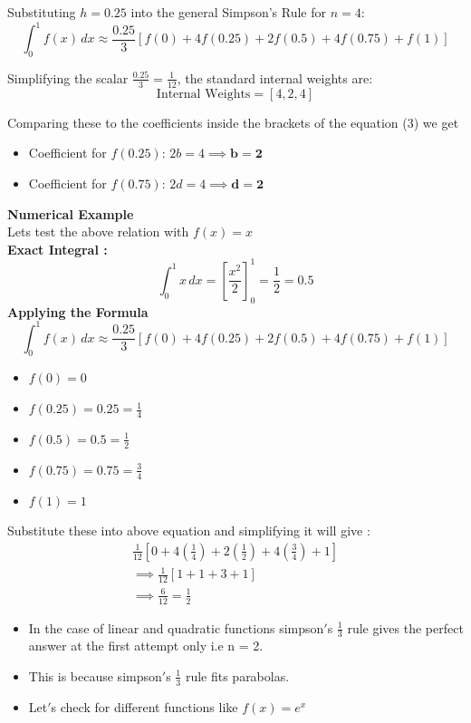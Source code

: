 \documentclass[a4paper,12pt]{article}
\theoremstyle{remark}
\begin{document}
Substituting $h = 0.25$ into the general Simpson's Rule for $n=4$:
\begin{equation}
\int_{0}^{1} f(x) \, dx \approx \frac{0.25}{3} \left[ f(0) + 4f(0.25) + 2f(0.5) + 4f(0.75) + f(1) \right]
\end{equation}

Simplifying the scalar $\frac{0.25}{3} = \frac{1}{12}$, the standard internal weights are:
\begin{equation}
\text{Internal Weights} = [4, 2, 4]
\end{equation}

Comparing these to the coefficients inside the brackets of the equation (3) we get
\begin{itemize}
    \item Coefficient for $f(0.25)$: $2b = 4 \implies \mathbf{b = 2}$
    \item Coefficient for $f(0.75)$: $2d = 4 \implies \mathbf{d = 2}$
\end{itemize}
\textbf{Numerical Example}\\
Lets test the above relation with $f(x) = x$
\\ \textbf{ Exact Integral :}\\
\begin{equation}
\int_{0}^{1} x \, dx = \left[ \frac{x^2}{2} \right]_0^1 = \frac{1}{2} = 0.5
\end{equation}
\textbf{ Applying the Formula} \\
\begin{equation}
\int_{0}^{1} f(x) \, dx \approx \frac{0.25}{3} \left[ f(0) + 4f(0.25) + 2f(0.5) + 4f(0.75) + f(1) \right]
\end{equation}
\begin{itemize}
    \item $f(0) = 0$
    \item $f(0.25) = 0.25 = \frac{1}{4}$
    \item $f(0.5) = 0.5 = \frac{1}{2}$
    \item $f(0.75) = 0.75 = \frac{3}{4}$
    \item $f(1) = 1$
\end{itemize}
Substitute these into above equation  and simplifying  it will give :
\begin{align}
\frac{1}{12} \left[ 0 + 4\left(\frac{1}{4}\right) + 2\left(\frac{1}{2}\right) + 4\left(\frac{3}{4}\right) + 1 \right]  \\
\implies \frac{1}{12} \left[ 1 + 1 + 3 + 1 \right] \\
\implies \frac{6}{12} = \frac{1}{2}
\end{align}
\begin{itemize}
    \item In the case of linear and  quadratic functions simpson$'$s $\frac{1}{3}$ rule gives the perfect answer at the first attempt only i.e n = 2.
    \item This is because simpson$'$s $\frac{1}{3}$ rule fits parabolas.
     \item Let$'$s check for different functions like $f(x) = e^x$
\end{itemize}
\end{document}
